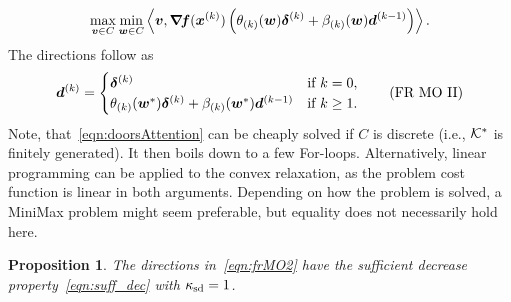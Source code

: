 \documentclass{article}
\theoremstyle{plain}
\newtheorem{proposition}[theorem]{Proposition}
\theoremstyle{definition}
\begin{document}
\begin{equation}
	\max_{\bm{v}\in C}
	\min_{\bm{w}\in C}
	\left\langle \bm{v}, 
		\bm{\nabla}\!\bm{f}(\bm{x}^{(k)})
		\left(
			\theta_{(k)}(\bm{w})
			\bm{\delta}^{(k)}
			+
			\beta_{(k)}(\bm{w})
			\bm{d}^{(k-1)}
		\right)
	 \right\rangle
	.
	\label{eqn:doorsAttention}
\end{equation}
The directions follow as
\begin{equation}
	\bm{d}^{(k)} =
	\begin{cases}
		\bm{\delta}^{(k)}
		&\text{if $k=0$},
		\\
		\theta_{(k)}(\bm{w}^*)
			\bm{\delta}^{(k)}
			+
			\beta_{(k)}(\bm{w}^*)
			\bm{d}^{(k-1)}
		&\text{if $k \geq 1$.}
	\end{cases}
	\tag{FR~MO~II}
\end{equation}
Note, that~\eqref{eqn:doorsAttention} can be cheaply solved if $C$ is discrete 
(i.e., $\mathcal K^*$ is finitely generated).
It then boils down to a few For-loops.
Alternatively, linear programming can be applied to the convex relaxation, 
as the problem cost function is linear in both arguments.
Depending on how the problem is solved, a MiniMax problem might seem preferable,
but equality does not necessarily hold here.

\begin{proposition}
	The directions in~\eqref{eqn:frMO2} have the 
	sufficient decrease property~\eqref{eqn:suff_dec}
	with $\kappa_{\mathrm{sd}} = 1$.
\end{proposition}
\end{document}
